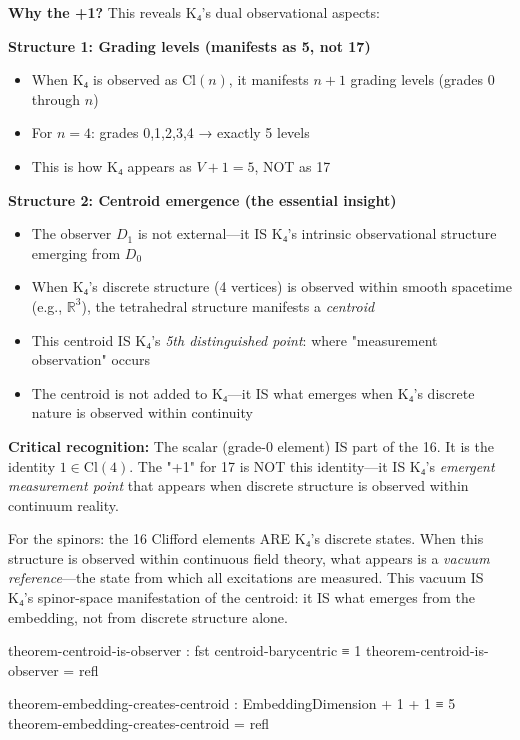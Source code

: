 \documentclass[11pt,a4paper]{book}
\begin{document}
\textbf{Why the +1?} This reveals K₄'s dual observational aspects:

\textbf{Structure 1: Grading levels (manifests as 5, not 17)}
\begin{itemize}
\item When K₄ is observed as $\text{Cl}(n)$, it manifests $n+1$ grading levels (grades 0 through $n$)
\item For $n=4$: grades 0,1,2,3,4 → exactly 5 levels
\item This is how K₄ appears as $V + 1 = 5$, NOT as 17
\end{itemize}

\textbf{Structure 2: Centroid emergence (the essential insight)}
\begin{itemize}
\item The observer $D_1$ is not external—it IS K₄'s intrinsic observational structure emerging from $D_0$
\item When K₄'s discrete structure (4 vertices) is observed within smooth spacetime (e.g., $\mathbb{R}^3$), 
      the tetrahedral structure manifests a \emph{centroid}
\item This centroid IS K₄'s \emph{5th distinguished point}: where "measurement observation" occurs
\item The centroid is not added to K₄—it IS what emerges when K₄'s discrete nature is observed within continuity
\end{itemize}

\textbf{Critical recognition:} The scalar (grade-0 element) IS part of the 16. It is the 
identity $1 \in \text{Cl}(4)$. The "+1" for 17 is NOT this identity—it IS K₄'s 
\emph{emergent measurement point} that appears when discrete structure is observed 
within continuum reality.

For the spinors: the 16 Clifford elements ARE K₄'s discrete states. When this structure 
is observed within continuous field theory, what appears is a \emph{vacuum reference}—the 
state from which all excitations are measured. This vacuum IS K₄'s spinor-space manifestation 
of the centroid: it IS what emerges from the embedding, not from discrete structure alone.

\begin{code}
theorem-centroid-is-observer : fst centroid-barycentric ≡ 1
theorem-centroid-is-observer = refl

theorem-embedding-creates-centroid : EmbeddingDimension + 1 + 1 ≡ 5
theorem-embedding-creates-centroid = refl
\end{code}
\end{document}
